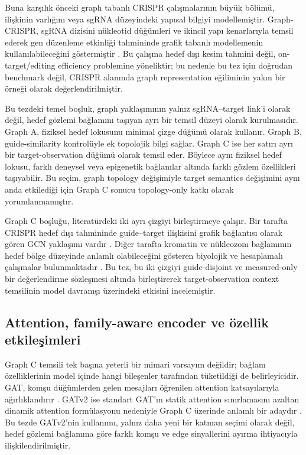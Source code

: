Buna karşılık önceki graph tabanlı CRISPR çalışmalarının büyük bölümü, ilişkinin varlığını veya sgRNA düzeyindeki yapısal bilgiyi modellemiştir. Graph-CRISPR, sgRNA dizisini nükleotid düğümleri ve ikincil yapı kenarlarıyla temsil ederek gen düzenleme etkinliği tahmininde grafik tabanlı modellemenin kullanılabileceğini göstermiştir . Bu çalışma hedef dışı kesim tahmini değil, on-target/editing efficiency problemine yöneliktir; bu nedenle bu tez için doğrudan benchmark değil, CRISPR alanında graph representation eğiliminin yakın bir örneği olarak değerlendirilmiştir.

Bu tezdeki temel boşluk, graph yaklaşımının yalnız sgRNA--target link'i olarak değil, hedef gözlemi bağlamını taşıyan ayrı bir temsil düzeyi olarak kurulmasıdır. Graph A, fiziksel hedef lokusunu minimal çizge düğümü olarak kullanır. Graph B, guide-similarity kontrolüyle ek topolojik bilgi sağlar. Graph C ise her satırı ayrı bir target-observation düğümü olarak temsil eder. Böylece aynı fiziksel hedef lokusu, farklı deneysel veya epigenetik bağlamlar altında farklı gözlem özellikleri taşıyabilir. Bu seçim, graph topology değişimiyle target semantics değişimini aynı anda etkilediği için Graph C sonucu topology-only katkı olarak yorumlanmamıştır.

Graph C boşluğu, literatürdeki iki ayrı çizgiyi birleştirmeye çalışır. Bir tarafta CRISPR hedef dışı tahmininde guide--target ilişkisini grafik bağlantısı olarak gören GCN yaklaşımı vardır . Diğer tarafta kromatin ve nükleozom bağlamının hedef bölge düzeyinde anlamlı olabileceğini gösteren biyolojik ve hesaplamalı çalışmalar bulunmaktadır . Bu tez, bu iki çizgiyi guide-disjoint ve measured-only bir değerlendirme sözleşmesi altında birleştirerek target-observation context temsilinin model davranışı üzerindeki etkisini incelemiştir.

\subsection{Attention, family-aware encoder ve özellik etkileşimleri}

Graph C temsili tek başına yeterli bir mimari varsayım değildir; bağlam özelliklerinin model içinde hangi bileşenler tarafından tüketildiği de belirleyicidir. GAT, komşu düğümlerden gelen mesajları öğrenilen attention katsayılarıyla ağırlıklandırır . GATv2 ise standart GAT'ın statik attention sınırlamasını azaltan dinamik attention formülasyonu nedeniyle Graph C üzerinde anlamlı bir adaydır . Bu tezde GATv2'nin kullanımı, yalnız daha yeni bir katman seçimi olarak değil, hedef gözlemi bağlamına göre farklı komşu ve edge sinyallerini ayırma ihtiyacıyla ilişkilendirilmiştir.

